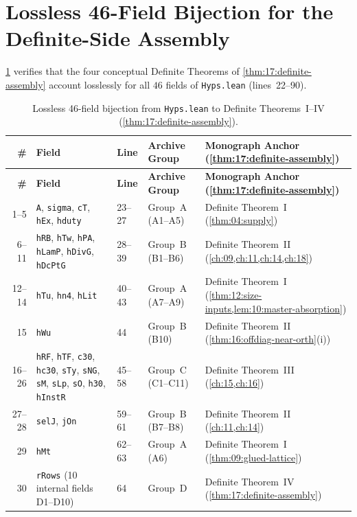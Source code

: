 \section{Lossless 46-Field Bijection for the Definite-Side Assembly}
\label{sec:appA:hyps46}

\cref{tab:appA:hyps46} verifies that the four conceptual Definite Theorems of \cref{thm:17:definite-assembly} account losslessly for all $46$ fields of \texttt{Hyps.lean} (lines~22--90).

\begin{longtable}{@{}rllll@{}}
\caption{Lossless 46-field bijection from \texttt{Hyps.lean} to Definite Theorems~I--IV (\cref{thm:17:definite-assembly}).}
\label{tab:appA:hyps46}\\
\toprule
\textbf{\#} & \textbf{Field} & \textbf{Line} & \textbf{Archive Group} & \textbf{Monograph Anchor (\cref{thm:17:definite-assembly})} \\
\midrule
\endfirsthead
\toprule
\textbf{\#} & \textbf{Field} & \textbf{Line} & \textbf{Archive Group} & \textbf{Monograph Anchor (\cref{thm:17:definite-assembly})} \\
\midrule
\endhead
1--5 & \texttt{A}, \texttt{sigma}, \texttt{cT}, \texttt{hEx}, \texttt{hduty} & 23--27 & Group~A (A1--A5) & Definite Theorem~I (\cref{thm:04:supply}) \\
6--11 & \texttt{hRB}, \texttt{hTw}, \texttt{hPA}, \texttt{hLamP}, \texttt{hDivG}, \texttt{hDcPtG} & 28--39 & Group~B (B1--B6) & Definite Theorem~II (\cref{ch:09,ch:11,ch:14,ch:18}) \\
12--14 & \texttt{hTu}, \texttt{hn4}, \texttt{hLit} & 40--43 & Group~A (A7--A9) & Definite Theorem~I (\cref{thm:12:size-inputs,lem:10:master-absorption}) \\
15 & \texttt{hWu} & 44 & Group~B (B10) & Definite Theorem~II (\cref{thm:16:offdiag-near-orth}(i)) \\
16--26 & \texttt{hRF}, \texttt{hTF}, \texttt{c30}, \texttt{hc30}, \texttt{sTy}, \texttt{sNG}, \texttt{sM}, \texttt{sLp}, \texttt{sO}, \texttt{h30}, \texttt{hInstR} & 45--58 & Group~C (C1--C11) & Definite Theorem~III (\cref{ch:15,ch:16}) \\
27--28 & \texttt{selJ}, \texttt{jOn} & 59--61 & Group~B (B7--B8) & Definite Theorem~II (\cref{ch:11,ch:14}) \\
29 & \texttt{hMt} & 62--63 & Group~A (A6) & Definite Theorem~I (\cref{thm:09:glued-lattice}) \\
30 & \texttt{rRows} (10 internal fields D1--D10) & 64 & Group~D & Definite Theorem~IV (\cref{thm:17:definite-assembly}) \\

\end{longtable}
